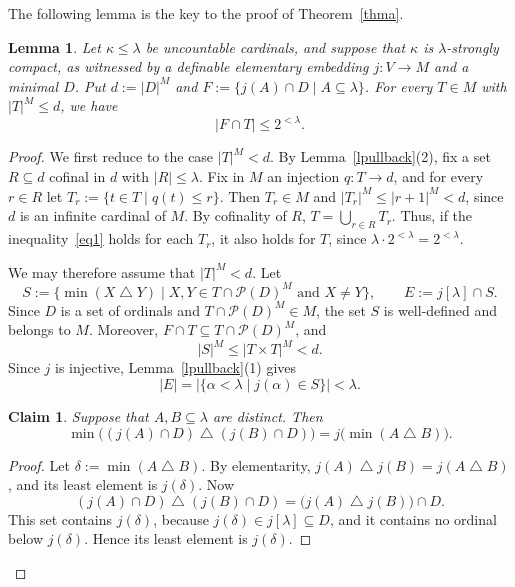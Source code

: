 \documentclass[11pt,reqno]{amsart}
\newtheorem{lemma}[thm]{Lemma}
\newtheorem{claim}{Claim}[thm]
\theoremstyle{definition}
\theoremstyle{remark}
\newcommand\symdiff{\mathbin{\bigtriangleup}}
\renewcommand{\mid}{\mathrel{|}\allowbreak}
\newcommand\s{\subseteq}
\begin{document}
The following lemma is the key to the proof of Theorem~\ref{thma}.
\begin{lemma}\label{lcapacity}
    Let $\kappa\le\lambda$ be uncountable cardinals,
    and suppose that $\kappa$ is $\lambda$-strongly compact,
    as witnessed by a definable elementary embedding $j:V\rightarrow M$ and a minimal $D$.
    Put $d:=|D|^M$ and $F:=\{j(A)\cap D\mid A\subseteq\lambda\}$.
    For every $T\in M$ with $|T|^M\le d$, we have
    \begin{equation}\label{eq1}
        |F \cap T|\le 2^{<\lambda}.
    \end{equation}
\end{lemma}
\begin{proof}
    We first reduce to the case $|T|^M<d$.
    By Lemma~\ref{lpullback}(2), fix a set $R\subseteq d$ cofinal in $d$ with $|R|\le\lambda$.
    Fix in $M$ an injection $q:T\rightarrow d$, and for every $r\in R$ let $T_r:=\{t\in T\mid q(t)\le r\}$.
    Then $T_r\in M$ and $|T_r|^M\le|r+1|^M<d$, since $d$ is an infinite cardinal of $M$.
    By cofinality of $R$, $T=\bigcup_{r\in R}T_r$.
    Thus, if the inequality~\eqref{eq1} holds for each $T_r$, it also holds for $T$, since $\lambda\cdot 2^{<\lambda}=2^{<\lambda}$.

    We may therefore assume that $|T|^M<d$.
    Let
    $$S:=\{\min(X\symdiff Y)\mid X,Y\in T\cap\mathcal P(D)^M\text{ and }X\neq Y\}, \qquad E:=j[\lambda]\cap S.$$
    Since $D$ is a set of ordinals and $T\cap\mathcal P(D)^M\in M$, the set $S$ is well-defined and belongs to $M$.
    Moreover, $F\cap T\subseteq T\cap\mathcal P(D)^M$, and
    $$|S|^M\le|T\times T|^M<d.$$
    Since $j$ is injective, Lemma~\ref{lpullback}(1) gives
    $$|E|=|\{\alpha<\lambda\mid j(\alpha)\in S\}|<\lambda.$$

    \begin{claim}\label{cldelta}
        Suppose that $A,B\s\lambda$ are distinct. Then
        $$\min\bigl((j(A)\cap D)\symdiff(j(B)\cap D)\bigr)=j\bigl(\min(A\symdiff B)\bigr).$$
    \end{claim}
    \begin{proof}
        Let $\delta:=\min(A\symdiff B)$.
        By elementarity, $j(A)\symdiff j(B)=j(A\symdiff B)$, and its least element is $j(\delta)$.
        Now
        $$(j(A)\cap D)\symdiff(j(B)\cap D)=\bigl(j(A)\symdiff j(B)\bigr)\cap D.$$
        This set contains $j(\delta)$, because $j(\delta)\in j[\lambda]\s D$,
        and it contains no ordinal below $j(\delta)$.
        Hence its least element is $j(\delta)$.
    \end{proof}


\end{proof}
\end{document}
